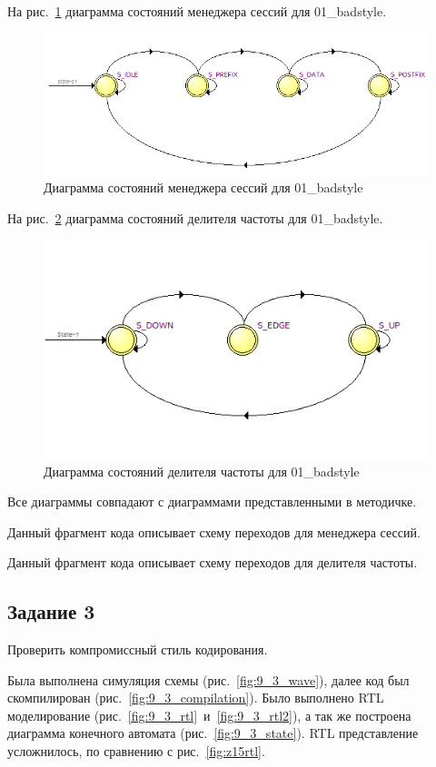 \documentclass[a4paper,14pt]{article}
\begin{document}
	На рис.~\ref{fig:z15auto} диаграмма состояний менеджера сессий для 01\_badstyle.
	
	\begin{figure}[H]
		\centering
		\includegraphics[width=0.6\linewidth]{images/z1_5_auto}
		\caption{Диаграмма состояний менеджера сессий для 01\_badstyle}
		\label{fig:z15auto}
	\end{figure}
	
	На рис.~\ref{fig:z15autoclkdivider} диаграмма состояний делителя частоты для 01\_badstyle.
	
	\begin{figure}[H]
		\centering
		\includegraphics[width=0.6\linewidth]{images/z1_5_auto_clk_divider}
		\caption{Диаграмма состояний делителя частоты для 01\_badstyle}
		\label{fig:z15autoclkdivider}
	\end{figure}

	Все диаграммы совпадают с диаграммами представленными в методичке.
	
	Данный фрагмент кода описывает схему переходов для менеджера сессий.
	
	{\small {}}

	Данный фрагмент кода описывает схему переходов для делителя частоты.
	
	{\small {}}
	
	\subsection{Задание 3}
	
	Проверить компромиссный стиль кодирования.
	
	Была выполнена симуляция схемы (рис.~\ref{fig:9_3_wave}), далее код был скомпилирован (рис.~\ref{fig:9_3_compilation}).
	Было выполнено RTL моделирование (рис.~\ref{fig:9_3_rtl}~и~\ref{fig:9_3_rtl2}), а так же построена диаграмма конечного автомата (рис.~\ref{fig:9_3_state}).
	RTL представление усложнилось, по сравнению с рис.~\ref{fig:z15rtl}.
	
\end{document}
